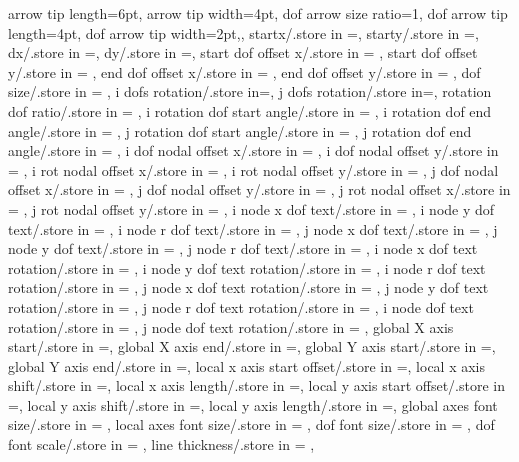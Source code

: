 {{arrow tip length=6pt,
arrow tip width=4pt,
dof arrow size ratio=1,
dof arrow tip length=4pt,
dof arrow tip width=2pt,},
startx/.store in =\startx,
starty/.store in =\starty,
dx/.store in =\deltaxdir,
dy/.store in =\deltaydir,
start dof offset x/.store in = \startoffsetx,
start dof offset y/.store in = \startoffsety,
end dof offset x/.store in = \endoffsetx,
end dof offset y/.store in = \endoffsety,
dof size/.store in = \lengthdofs,
i dofs rotation/.store in=\dofsroti,
j dofs rotation/.store in=\dofsrotj,
rotation dof ratio/.store in = \rotationdofratio,
i rotation dof start angle/.store in = \irotdofstartangle,
i rotation dof end angle/.store in = \irotdofendangle,
j rotation dof start angle/.store in = \jrotdofstartangle,
j rotation dof end angle/.store in = \jrotdofendangle, 
i dof nodal offset x/.store in = \idofnodaloffsetx,
i dof nodal offset y/.store in = \idofnodaloffsety,
i rot nodal offset x/.store in = \irotnodaloffsetx,
i rot nodal offset y/.store in = \irotnodaloffsety,
j dof nodal offset x/.store in = \jdofnodaloffsetx,
j dof nodal offset y/.store in = \jdofnodaloffsety,
j rot nodal offset x/.store in = \jrotnodaloffsetx,
j rot nodal offset y/.store in = \jrotnodaloffsety,
i node x dof text/.store in = \inodexdoftext,
i node y dof text/.store in = \inodeydoftext,
i node r dof text/.store in = \inoderdoftext,
j node x dof text/.store in = \jnodexdoftext,
j node y dof text/.store in = \jnodeydoftext,
j node r dof text/.store in = \jnoderdoftext,
i node x dof text rotation/.store in = \inodexdoftextrot,
i node y dof text rotation/.store in = \inodeydoftextrot,
i node r dof text rotation/.store in = \inoderdoftextrot,
j node x dof text rotation/.store in = \jnodexdoftextrot,
j node y dof text rotation/.store in = \jnodeydoftextrot,
j node r dof text rotation/.store in = \jnoderdoftextrot,
i node dof text rotation/.store in = \inodedoftextrot,
j node dof text rotation/.store in = \jnodedoftextrot,
global X axis start/.store in =\globalXstart,
global X axis end/.store in =\globalXend,
global Y axis start/.store in =\globalYstart,
global Y axis end/.store in =\globalYend,
local x axis start offset/.store in =\localxstartoffset,
local x axis shift/.store in =\localxshift,
local x axis length/.store in =\localxlength,
local y axis start offset/.store in =\localystartoffset,
local y axis shift/.store in =\localyshift,
local y axis length/.store in =\localylength,
global axes font size/.store in = \globalaxesfontsize,
local axes font size/.store in = \localaxesfontsize,
dof font size/.store in = \doffontsize,
dof font scale/.store in = \doffontscale,
line thickness/.store in = \linethickness,
}
